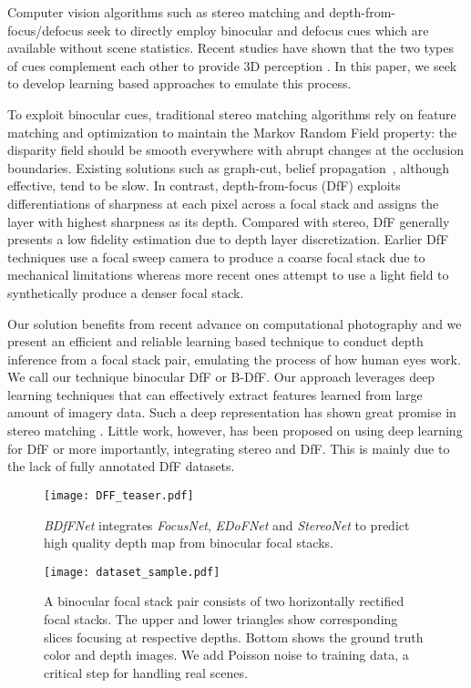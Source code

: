 \documentclass[10pt,twocolumn,letterpaper]{article}
\begin{document}
Computer vision algorithms such as stereo matching \cite{scharstein02, brown03} and depth-from-focus/defocus \cite{nayar92, nayar94, malik07, favaro05, favaro07} seek to directly employ binocular and defocus cues which are available without scene statistics. Recent studies have shown that the two types of cues complement each other to provide 3D perception \cite{held12}. In this paper, we seek to develop learning based approaches to emulate this process.

To exploit binocular cues, traditional stereo matching algorithms rely on feature matching and optimization to maintain the Markov Random Field property: the disparity field should be smooth everywhere with abrupt changes at the occlusion boundaries. Existing solutions such as graph-cut, belief propagation~\cite{kolmogorov02, sun03}, although effective, tend to be slow. In contrast, depth-from-focus (DfF) exploits differentiations of sharpness at each pixel across a focal stack and assigns the layer with highest sharpness as its depth. Compared with stereo, DfF generally presents a low fidelity estimation due to depth layer discretization. Earlier DfF techniques use a focal sweep camera to produce a coarse focal stack due to mechanical limitations whereas more recent ones attempt to use a light field to synthetically produce a denser focal stack.

Our solution benefits from recent advance on computational photography and we present an efficient and reliable learning based technique to conduct depth inference from a focal stack pair, emulating the process of how human eyes work. We call our technique binocular DfF or B-DfF. Our approach leverages deep learning techniques that can effectively extract features learned from large amount of imagery data. Such a deep representation has shown great promise in stereo matching \cite{zbontar15, zagoruyko15, luo16}. Little work, however, has been proposed on using deep learning for DfF or more importantly, integrating stereo and DfF. This is mainly due to the lack of fully annotated DfF datasets.

\begin{figure}[t]
\begin{center}
   \texttt{[image: DFF\_teaser.pdf]}
\end{center}
\vspace{-8pt}
   \caption{\emph{BDfFNet} integrates \emph{FocusNet}, \emph{EDoFNet} and \emph{StereoNet} to predict high quality depth map from binocular focal stacks.}
\label{fig:teaser}
\end{figure}
\begin{figure*}[t]
\begin{center}
   \texttt{[image: dataset\_sample.pdf]}
\end{center}
\vspace{-8pt}
   \caption{A binocular focal stack pair consists of two horizontally rectified focal stacks. The upper and lower triangles show corresponding slices focusing at respective depths. Bottom shows the ground truth color and depth images. We add Poisson noise to training data, a critical step for handling real scenes.}
\label{fig:dataset_sample}
\end{figure*}
\end{document}
